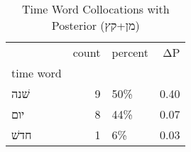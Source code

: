 \begin{table}[htbp!]
\centering
\caption{Time Word Collocations with Posterior (מן+קץ)}
\label{table:postמן+קץ_head_cpd}
\begin{tabular}{lrlr}
\toprule
{} &  count & percent &    ΔP \\
time word &        &         &       \\
\midrule
שׁנה      &      9 &     50\% &  0.40 \\
יום       &      8 &     44\% &  0.07 \\
חדשׁ      &      1 &      6\% &  0.03 \\
\bottomrule
\end{tabular}
\end{table}

